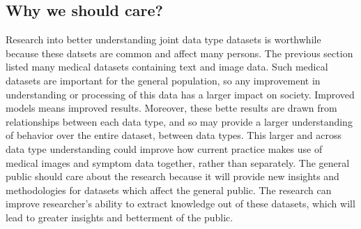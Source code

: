 \subsection{Why we should care?}

Research into better understanding joint data type datasets is worthwhile because these datsets are common and affect many persons.  The previous section listed many medical datasets containing text and image data.  Such medical datasets are important for the general population, so any improvement in understanding or processing of this data has a larger impact on society.  Improved models means improved results.  Moreover, these bette results are drawn from relationships between each data type, and so may provide a larger understanding of behavior over the entire dataset, between data types.  This larger and across data type understanding could improve how current practice makes use of medical images and symptom data together, rather than separately.  The general public should care about the research because it will provide new insights and methodologies for datasets which affect the general public.  The research can improve researcher's ability to extract knowledge out of these datasets, which will lead to greater insights and betterment of the public.



